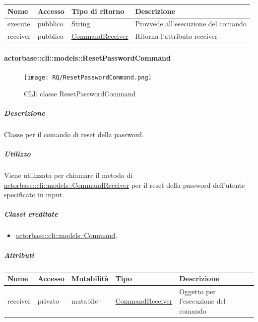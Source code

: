 \documentclass{scalatekids-article}
\begin{document}
\begin{tabular}{| p{3cm} | p{1.5cm} | p{3.5cm} | p{9cm} |}
  \hline
  Nome & Accesso & Tipo di ritorno & Descrizione\\
  \hline
  execute & pubblico & String & Provvede all'esecuzione del comando\\
  \hline
  receiver & pubblico & \hyperref[sec:actorbase::cli::models::CommandReceiver]{CommandReceiver} & Ritorna l'attributo receiver\\
  \hline
\end{tabular}

\paragraph{actorbase::cli::models::ResetPasswordCommand}
\label{sec:actorbase::cli::models::ResetPasswordCommand}

\begin{figure}[H]
  \begin{center}
    \texttt{[image: RQ/ResetPasswordCommand.png]}
    \caption{CLI: classe ResetPasswordCommand}
  \end{center}
\end{figure}

\subparagraph{Descrizione}

Classe per il comando di reset della password.

\subparagraph{Utilizzo}

Viene utilizzata per chiamare il metodo di
\hyperref[sec:actorbase::cli::models::CommandReceiver]{actorbase::cli::models::CommandReceiver} per il reset della password
dell'utente specificato in input.

\subparagraph{Classi ereditate}

\begin{itemize}
\item \hyperref[sec:actorbase::cli::models::Command]{actorbase::cli::models::Command}.
\end{itemize}

\subparagraph{Attributi}

\begin{tabular}{| p{1cm} | p{1.5cm} | p{2cm} | p{4cm} | p{8.5cm} |}
  \hline
  Nome & Accesso & Mutabilità & Tipo & Descrizione\\
  \hline
  receiver & privato & mutabile & \hyperref[sec:actorbase::cli::models::CommandReceiver]{CommandReceiver} & Oggetto per l'esecuzione del comando\\
  \hline
\end{tabular}
\end{document}
